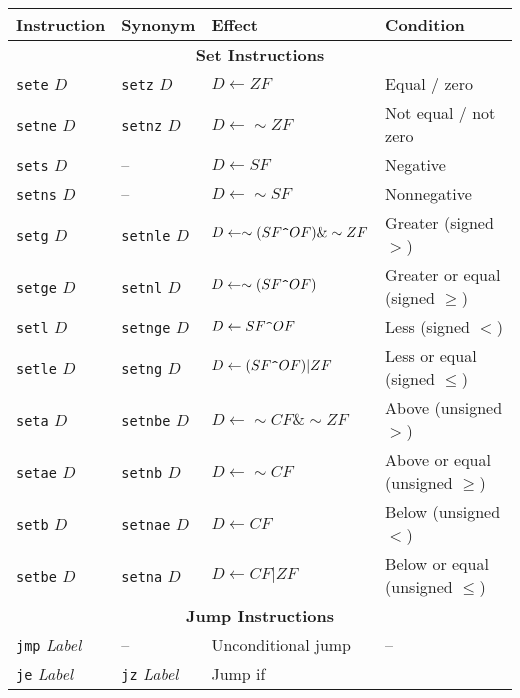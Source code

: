 \clearpage
\begin{table}[h]
    \centering
    \small
    \renewcommand{\arraystretch}{1.2}
    \begin{tabular}{l l l l}
        \toprule
        \textbf{Instruction} & \textbf{Synonym} & \textbf{Effect} & \textbf{Condition} \\
        \midrule
        \multicolumn{4}{c}{\textbf{Set Instructions}} \\
        \midrule
        \texttt{sete} $D$  & \texttt{setz} $D$  & $D \leftarrow 
        ZF$ & Equal / zero \\
        \texttt{setne} $D$  & \texttt{setnz} $D$  & $D \leftarrow 
        \sim ZF$ & Not equal / not zero \\
        \texttt{sets} $D$  & – & $D \leftarrow SF$ & Negative \\
        \texttt{setns} $D$  & – & $D \leftarrow \sim SF$ & Nonnegative \\
        \texttt{setg} $D$  & \texttt{setnle} $D$  & $D \leftarrow 
        \sim (SF \texttt{\string^} OF) \& \sim ZF$ & Greater (signed $>$) \\
        \texttt{setge} $D$  & \texttt{setnl} $D$  & $D \leftarrow 
        \sim (SF \texttt{\string^} OF)$ & Greater or equal (signed $\geq$) \\
        \texttt{setl} $D$  & \texttt{setnge} $D$  & $D \leftarrow 
        SF \texttt{\string^} OF$ & Less (signed $<$) \\
        \texttt{setle} $D$  & \texttt{setng} $D$  & $D \leftarrow 
        (SF \texttt{\string^} OF) | ZF$ & Less or equal (signed $\leq$) \\
        \texttt{seta} $D$  & \texttt{setnbe} $D$  & $D \leftarrow 
        \sim CF \& \sim ZF$ & Above (unsigned $>$) \\
        \texttt{setae} $D$  & \texttt{setnb} $D$  & $D \leftarrow 
        \sim CF$ & Above or equal (unsigned $\geq$) \\
        \texttt{setb} $D$  & \texttt{setnae} $D$  & $D \leftarrow 
        CF$ & Below (unsigned $<$) \\
        \texttt{setbe} $D$  & \texttt{setna} $D$  & $D \leftarrow 
        CF | ZF$ & Below or equal (unsigned $\leq$) \\
        \midrule
        \multicolumn{4}{c}{\textbf{Jump Instructions}} \\
        \midrule
                \texttt{jmp} \textit{Label}  & – & Unconditional jump & – \\
        \texttt{je} \textit{Label}  & \texttt{jz} \textit{Label} & Jump if 

\end{tabular}
\end{table}
